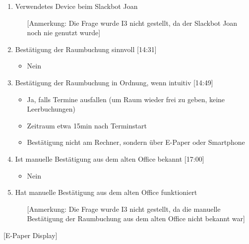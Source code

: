 \begin{enumerate}
    \item Verwendetes Device beim Slackbot Joan
     \begin{itemize}
        \item[] [Anmerkung: Die Frage wurde I3 nicht gestellt, da der Slackbot Joan noch nie genutzt wurde] 
    \end{itemize}
    
    \item Bestätigung der Raumbuchung sinnvoll [14:31]
     \begin{itemize}
        \item Nein
    \end{itemize}
    
    \item Bestätigung der Raumbuchung in Ordnung, wenn intuitiv [14:49]
     \begin{itemize}
        \item Ja, falls Termine ausfallen (um Raum wieder frei zu geben, keine Leerbuchungen)
        \item Zeitraum etwa 15min nach Terminstart
        \item Bestätigung nicht am Rechner, sondern über E-Paper oder Smartphone
    \end{itemize}
    
    \item Ist manuelle Bestätigung aus dem alten Office bekannt [17:00]
     \begin{itemize}
        \item Nein
    \end{itemize}
    
    \item Hat manuelle Bestätigung aus dem alten Office funktioniert
     \begin{itemize}
        \item[] [Anmerkung: Die Frage wurde I3 nicht gestellt, da die manuelle Bestätigung der Raumbuchung aus dem alten Office nicht bekannt war]
    \end{itemize}

\end{enumerate}

[E-Paper Display]

